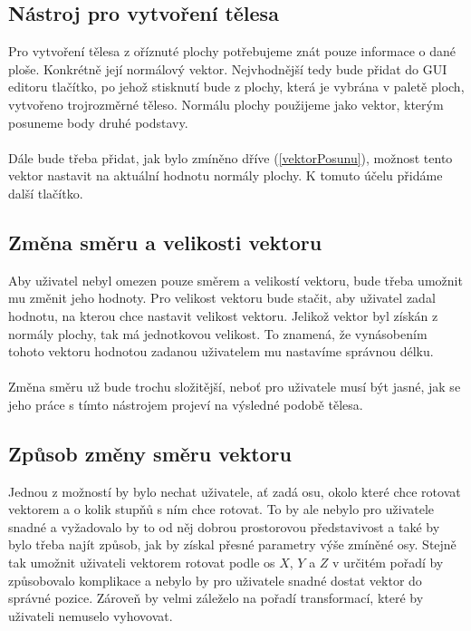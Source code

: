 \documentclass[11pt,twoside,a4paper]{book}
\begin{document}
\subsection{Nástroj pro vytvoření tělesa}
Pro vytvoření tělesa z oříznuté plochy potřebujeme znát pouze informace o dané ploše. Konkrétně její normálový vektor. Nejvhodnější tedy bude přidat do GUI editoru tlačítko, po jehož stisknutí bude z plochy, která je vybrána v paletě ploch, vytvořeno trojrozměrné těleso. Normálu plochy použijeme jako vektor, kterým posuneme body druhé podstavy.
\paragraph{}
Dále bude třeba přidat, jak bylo zmíněno dříve (\ref{vektorPosunu}), možnost tento vektor nastavit na aktuální hodnotu normály plochy. K tomuto účelu přidáme další tlačítko.

\subsection{Změna směru a velikosti vektoru}
Aby uživatel nebyl omezen pouze směrem a velikostí vektoru, bude třeba umožnit mu změnit jeho hodnoty. Pro velikost vektoru bude stačit, aby uživatel zadal hodnotu, na kterou chce nastavit velikost vektoru. Jelikož vektor byl získán z normály plochy, tak má jednotkovou velikost. To znamená, že vynásobením tohoto vektoru hodnotou zadanou uživatelem mu nastavíme správnou délku. 
\paragraph{}
Změna směru už bude trochu složitější, neboť pro uživatele musí být jasné, jak se jeho práce s tímto nástrojem projeví na výsledné podobě tělesa.

\subsection{Způsob změny směru vektoru}
\label{rotace}
Jednou z možností by bylo nechat uživatele, ať zadá osu, okolo které chce rotovat vektorem a o kolik stupňů s ním chce rotovat. To by ale nebylo pro uživatele snadné a vyžadovalo by to od něj dobrou prostorovou představivost a také by bylo třeba najít způsob, jak by získal přesné parametry výše zmíněné osy. Stejně tak umožnit uživateli vektorem rotovat podle os $X$, $Y$ a $Z$ v určitém pořadí by způsobovalo komplikace a nebylo by pro uživatele snadné dostat vektor do správné pozice. Zároveň by velmi záleželo na pořadí transformací, které by uživateli nemuselo vyhovovat.
\end{document}
